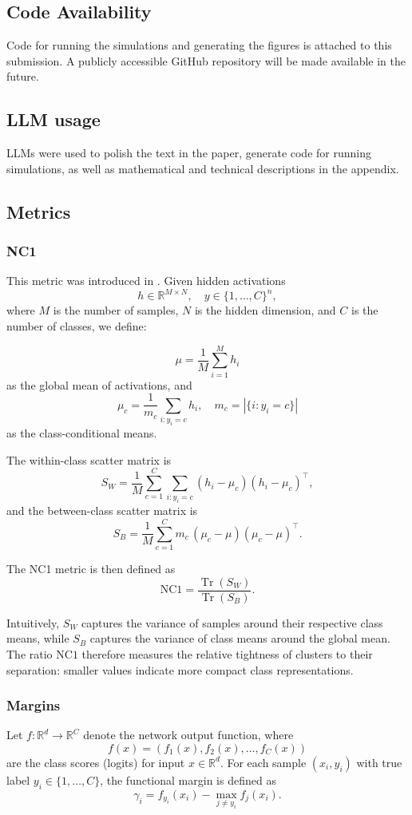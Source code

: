 \documentclass{article}
\begin{document}
\subsection{Code Availability}
Code for running the simulations and generating the figures is attached to this submission. A publicly accessible GitHub repository will be made available in the future.

\subsection{LLM usage}
LLMs were used to polish the text in the paper, generate code for running simulations, as well as mathematical and technical descriptions in the appendix.

\subsection{Metrics}

\subsubsection{NC1}
This metric was introduced in \cite{papyan2020prevalence}. Given hidden activations 
\[
h \in \mathbb{R}^{M \times N}, \quad y \in \{1, \dots, C\}^n,
\]
where $M$ is the number of samples, $N$ is the hidden dimension, and $C$ is the number of classes, we define:

\[
\mu = \frac{1}{M} \sum_{i=1}^M h_i
\]
as the global mean of activations, and
\[
\mu_c = \frac{1}{m_c} \sum_{i: y_i = c} h_i, \quad m_c = |\{i : y_i = c\}|
\]
as the class-conditional means.

The within-class scatter matrix is
\[
S_W = \frac{1}{M} \sum_{c=1}^C \sum_{i: y_i=c} (h_i - \mu_c)(h_i - \mu_c)^\top,
\]
and the between-class scatter matrix is
\[
S_B = \frac{1}{M} \sum_{c=1}^C m_c \, (\mu_c - \mu)(\mu_c - \mu)^\top.
\]

The NC1 metric is then defined as
\[
\mathrm{NC1} = \frac{\operatorname{Tr}(S_W)}{\operatorname{Tr}(S_B)}.
\]

\noindent
Intuitively, $S_W$ captures the variance of samples around their respective class means, while $S_B$ captures the variance of class means around the global mean. The ratio $\mathrm{NC1}$ therefore measures the relative tightness of clusters to their separation: smaller values indicate more compact class representations.

\subsubsection{Margins}
Let $f : \mathbb{R}^d \to \mathbb{R}^C$ denote the network output function, where 
\[
f(x) = (f_1(x), f_2(x), \dots, f_C(x))
\]
are the class scores (logits) for input $x \in \mathbb{R}^d$.  
For each sample $(x_i, y_i)$ with true label $y_i \in \{1, \dots, C\}$, the functional margin is defined as
\[
\gamma_i = f_{y_i}(x_i) - \max_{j \neq y_i} f_j(x_i).
\]
\end{document}
